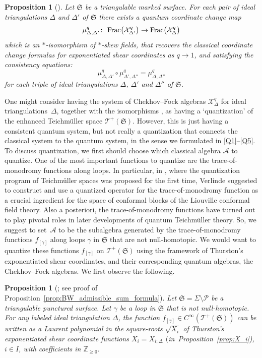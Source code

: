 \documentclass[pdftex]{sigma}
\numberwithin{equation}{section}
\newtheorem{Proposition}[Theorem]{Proposition}
\theoremstyle{definition}
\begin{document}
\begin{Proposition}[\cite{BL07, CF, FG09, Kash98, Liu}]
\label{prop:mu_q_Delta_Delta_prime}
Let $\mathfrak{S}$ be a triangulable marked surface.
For each pair of ideal triangulations $\Delta$ and $\Delta'$ of $\mathfrak{S}$ there exists a quantum coordinate change map
\[
\mu^q_{\Delta,\Delta'} \colon \ {\rm Frac}\bigl(\mathcal{X}^q_{\Delta'}\bigr) \to {\rm Frac}\bigl(\mathcal{X}^q_\Delta\bigr)
\]
which is an $*$-isomorphism of $*$-skew fields, that recovers the classical coordinate change formulas for exponentiated shear coordinates as $q\to 1$, and satisfying the consistency equations:
\[
\mu^q_{\Delta,\Delta'} \circ \mu^q_{\Delta',\Delta''} = \mu^q_{\Delta,\Delta''}
\]
for each triple of ideal triangulations $\Delta$, $\Delta'$ and $\Delta''$ of $\mathfrak{S}$.
\end{Proposition}
One might consider having the system of Chekhov--Fock algebras $\mathcal{X}^q_\Delta$ for ideal triangulations~$\Delta$, together with the isomorphisms , as having a `quantization' of the enhanced Teichm\"uller space $\mathscr{T}^+(\mathfrak{S})$. However, this is just having a consistent quantum system, but not really a quantization that connects the classical system to the quantum system, in the sense we formulated in \ref{Q1}--\ref{Q5}.
To discuss quantization, we first should choose which classical algebra $\mathcal{A}$ to quantize. One of the most important functions to quantize are the trace-of-monodromy functions along loops. In particular, in \cite{Verlinde}, where the quantization program of Teichm\"uller spaces was proposed for the first time, Verlinde suggested to construct and use a quantized operator for the trace-of-monodromy function as a crucial ingredient for the space of conformal blocks of the Liouville conformal field theory. Also a posteriori, the trace-of-monodromy functions have turned out to play pivotal roles in later developments of quantum Teichm\"uller theory. So, we suggest to set~$\mathcal{A}$ to be the subalgebra generated by the trace-of-monodromy functions $f_{[\gamma]}$ along loops $\gamma$ in $\mathfrak{S}$ that are not null-homotopic.
We would want to quantize these functions $f_{[\gamma]}$ on $\mathscr{T}^+(\mathfrak{S})$ using the framework of Thurston's exponentiated shear coordinates, and their corresponding quantum algebras, the Chekhov--Fock algebras. We first observe the following.
\begin{Proposition}[\cite{F93, F97, FG06, FG07}; see proof of Proposition~\ref{prop:BW_admissible_sum_formula}]
\label{prop:classical_Laurentness}
Let $\mathfrak{S} = \Sigma\setminus \mathcal{P}$ be a triangulable punctured surface. Let $\gamma$ be a loop in $\mathfrak{S}$ that is not null-homotopic. For any labeled ideal triangulation $\Delta$, the function $f_{[\gamma]} \in C^\infty(\mathscr{T}^+(\mathfrak{S}))$ can be written as a Laurent polynomial in the square-roots $\sqrt{X_i}$ of Thurston's exponentiated shear coordinate functions $X_i = X_{i;\Delta}$ $($in~Proposition~{\rm \ref{prop:X_i})}, $i\in I$, with coefficients in $\mathbb{Z}_{\ge 0}$.
\end{Proposition}
\end{document}
